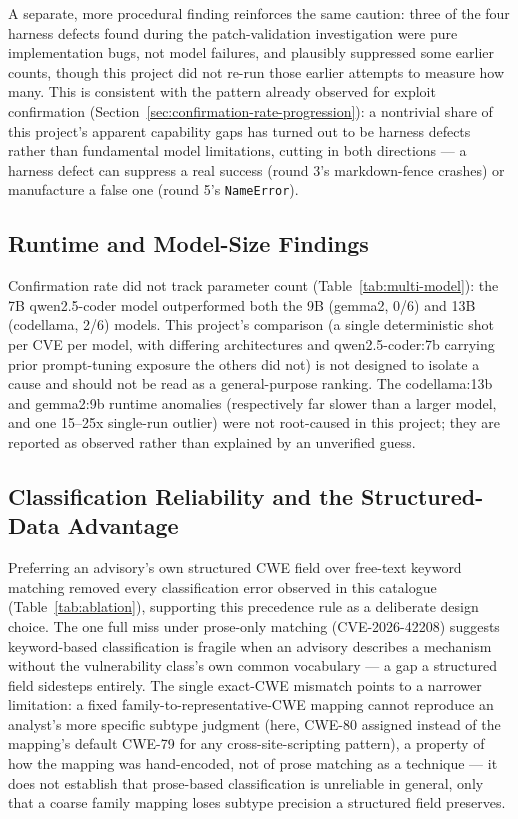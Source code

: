 \documentclass[12pt,a4paper]{report}
\begin{document}
A separate, more procedural finding reinforces the same caution: three of the four harness defects found during the patch-validation investigation were pure implementation bugs, not model failures, and plausibly suppressed some earlier counts, though this project did not re-run those earlier attempts to measure how many. This is consistent with the pattern already observed for exploit confirmation (Section~\ref{sec:confirmation-rate-progression}): a nontrivial share of this project's apparent capability gaps has turned out to be harness defects rather than fundamental model limitations, cutting in both directions — a harness defect can suppress a real success (round 3's markdown-fence crashes) or manufacture a false one (round 5's \texttt{NameError}).

\subsection{Runtime and Model-Size Findings}

Confirmation rate did not track parameter count (Table~\ref{tab:multi-model}): the 7B qwen2.5-coder model outperformed both the 9B (gemma2, 0/6) and 13B (codellama, 2/6) models. This project's comparison (a single deterministic shot per CVE per model, with differing architectures and qwen2.5-coder:7b carrying prior prompt-tuning exposure the others did not) is not designed to isolate a cause and should not be read as a general-purpose ranking. The codellama:13b and gemma2:9b runtime anomalies (respectively far slower than a larger model, and one 15--25x single-run outlier) were not root-caused in this project; they are reported as observed rather than explained by an unverified guess.

\subsection{Classification Reliability and the Structured-Data Advantage}

Preferring an advisory's own structured CWE field over free-text keyword matching removed every classification error observed in this catalogue (Table~\ref{tab:ablation}), supporting this precedence rule as a deliberate design choice. The one full miss under prose-only matching (CVE-2026-42208) suggests keyword-based classification is fragile when an advisory describes a mechanism without the vulnerability class's own common vocabulary — a gap a structured field sidesteps entirely. The single exact-CWE mismatch points to a narrower limitation: a fixed family-to-representative-CWE mapping cannot reproduce an analyst's more specific subtype judgment (here, CWE-80 assigned instead of the mapping's default CWE-79 for any cross-site-scripting pattern), a property of how the mapping was hand-encoded, not of prose matching as a technique — it does not establish that prose-based classification is unreliable in general, only that a coarse family mapping loses subtype precision a structured field preserves.
\end{document}
